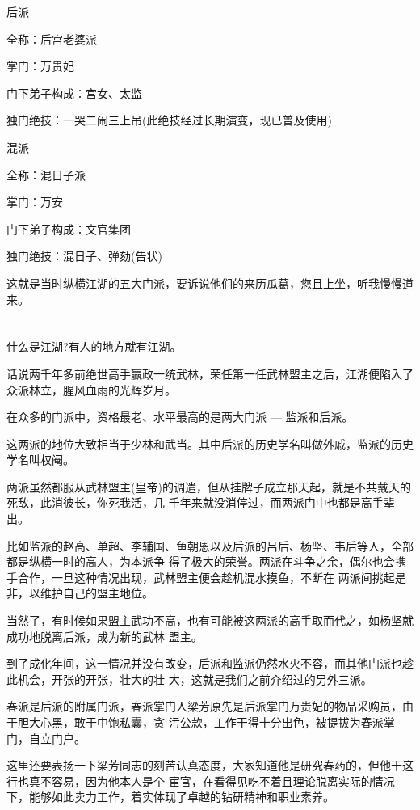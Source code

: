 \documentclass[11pt,a4paper,onecolumn]{article}
\begin{document}
后派

全称：后宫老婆派

掌门：万贵妃

门下弟子构成：宫女、太监

独门绝技：一哭二闹三上吊(此绝技经过长期演变，现已普及使用)

混派

全称：混日子派

掌门：万安

门下弟子构成：文官集团

独门绝技：混日子、弹劾(告状)

这就是当时纵横江湖的五大门派，要诉说他们的来历瓜葛，您且上坐，听我慢慢道来。

\section[\thesection]{}

什么是江湖?有人的地方就有江湖。

话说两千年多前绝世高手赢政一统武林，荣任第一任武林盟主之后，江湖便陷入了众派林立，腥风血雨的光辉岁月。

在众多的门派中，资格最老、水平最高的是两大门派 --- 监派和后派。

这两派的地位大致相当于少林和武当。其中后派的历史学名叫做外戚，监派的历史学名叫权阉。

两派虽然都服从武林盟主(皇帝)的调遣，但从挂牌子成立那天起，就是不共戴天的死敌，此消彼长，你死我活，几
千年来就没消停过，而两派门中也都是高手辈出。

比如监派的赵高、单超、李辅国、鱼朝恩以及后派的吕后、杨坚、韦后等人，全部都是纵横一时的高人，为本派争
得了极大的荣誉。两派在斗争之余，偶尔也会携手合作，一旦这种情况出现，武林盟主便会趁机混水摸鱼，不断在
两派间挑起是非，以维护自己的盟主地位。

当然了，有时候如果盟主武功不高，也有可能被这两派的高手取而代之，如杨坚就成功地脱离后派，成为新的武林
盟主。

到了成化年间，这一情况并没有改变，后派和监派仍然水火不容，而其他门派也趁此机会，开张的开张，壮大的壮
大，这就是我们之前介绍过的另外三派。

春派是后派的附属门派，春派掌门人梁芳原先是后派掌门万贵妃的物品采购员，由于胆大心黑，敢于中饱私囊，贪
污公款，工作干得十分出色，被提拔为春派掌门，自立门户。

这里还要表扬一下梁芳同志的刻苦认真态度，大家知道他是研究春药的，但他干这行也真不容易，因为他本人是个
宦官，在看得见吃不着且理论脱离实际的情况下，能够如此卖力工作，着实体现了卓越的钻研精神和职业素养。
\end{document}
